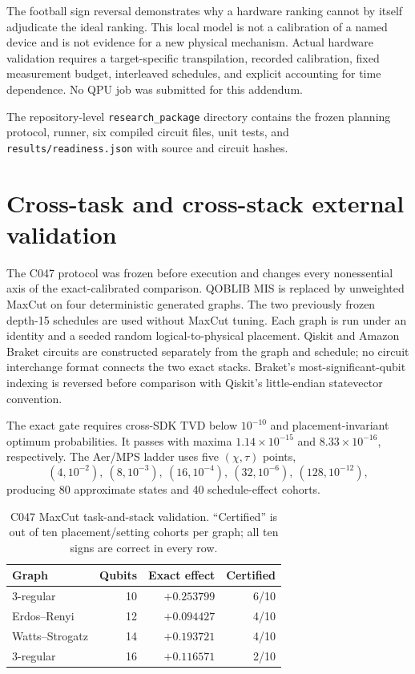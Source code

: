 \documentclass[10pt]{article}
\begin{document}
The football sign reversal demonstrates why a hardware ranking cannot by
itself adjudicate the ideal ranking. This local model is not a calibration
of a named device and is not evidence for a new physical mechanism. Actual
hardware validation requires a target-specific transpilation, recorded
calibration, fixed measurement budget, interleaved schedules, and explicit
accounting for time dependence. No QPU job was submitted for this addendum.

The repository-level \texttt{research\_package} directory contains the frozen
planning protocol, runner, six compiled circuit files, unit tests, and
\texttt{results/readiness.json} with source and circuit hashes.

\section{Cross-task and cross-stack external validation}

The C047 protocol was frozen before execution and changes every nonessential
axis of the exact-calibrated comparison. QOBLIB MIS is replaced by unweighted
MaxCut on four deterministic generated graphs. The two previously frozen
depth-15 schedules are used without MaxCut tuning. Each graph is run under an
identity and a seeded random logical-to-physical placement. Qiskit and Amazon
Braket circuits are constructed separately from the graph and schedule; no
circuit interchange format connects the two exact stacks. Braket's
most-significant-qubit indexing is reversed before comparison with Qiskit's
little-endian statevector convention.

The exact gate requires cross-SDK TVD below $10^{-10}$ and placement-invariant
optimum probabilities. It passes with maxima $1.14\times10^{-15}$ and
$8.33\times10^{-16}$, respectively. The Aer/MPS ladder uses five
$(\chi,\tau)$ points,
\[
 (4,10^{-2}),\ (8,10^{-3}),\ (16,10^{-4}),\
 (32,10^{-6}),\ (128,10^{-12}),
\]
producing 80 approximate states and 40 schedule-effect cohorts.

\begin{table}[H]
\centering
\caption{C047 MaxCut task-and-stack validation. ``Certified'' is out of ten
placement/setting cohorts per graph; all ten signs are correct in every row.}
\begin{tabular}{lrrr}
\toprule
Graph & Qubits & Exact effect & Certified \\
\midrule
3-regular & 10 & $+0.253799$ & 6/10 \\
Erdos--Renyi & 12 & $+0.094427$ & 4/10 \\
Watts--Strogatz & 14 & $+0.193721$ & 4/10 \\
3-regular & 16 & $+0.116571$ & 2/10 \\
\bottomrule
\end{tabular}
\end{table}
\end{document}
